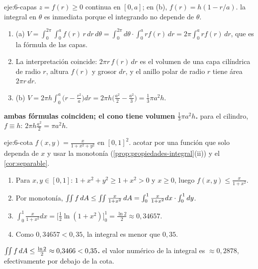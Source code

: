 \begin{solucion}{eje:6-capas}
\datos $z=f(r)\ge0$ continua en $[0,a]$; en (b), $f(r)=h(1-r/a)$.
\planteamiento la integral en $\theta$ es inmediata porque el integrando no depende de $\theta$.
\pasos
\begin{enumerate}[label=\arabic*.]
  \item (a) $V=\int_0^{2\pi}\int_0^af(r)\,r\,dr\,d\theta=\int_0^{2\pi}d\theta\cdot\int_0^arf(r)\,dr=2\pi\int_0^arf(r)\,dr$, que es la fórmula de las capas.
  \item La interpretación coincide: $2\pi r\,f(r)\,dr$ es el volumen de una capa cilíndrica de radio $r$, altura $f(r)$ y grosor $dr$, y el anillo polar de radio $r$ tiene área $2\pi r\,dr$.
  \item (b) $V=2\pi h\int_0^a\bigl(r-\frac{r^2}{a}\bigr)dr=2\pi h\bigl(\frac{a^2}2-\frac{a^2}3\bigr)=\frac13\pi a^2h$.
\end{enumerate}
\resultado \textbf{ambas fórmulas coinciden; el cono tiene volumen $\frac13\pi a^2h$.}
\comprobacion para el cilindro, $f\equiv h$: $2\pi h\frac{a^2}{2}=\pi a^2h$.
\end{solucion}

\begin{solucion}{eje:6-cota}
\datos $f(x,y)=\frac{x}{1+x^2+y^2}$ en $[0,1]^2$.
\planteamiento acotar por una función que solo dependa de $x$ y usar la monotonía (\cref{prop:propiedades-integral}(ii)) y el \cref{cor:separable}.
\pasos
\begin{enumerate}[label=\arabic*.]
  \item Para $x,y\in[0,1]$: $1+x^2+y^2\ge1+x^2>0$ y $x\ge0$, luego $f(x,y)\le\frac{x}{1+x^2}$.
  \item Por monotonía, $\iint f\,dA\le\iint\frac{x}{1+x^2}\,dA=\int_0^1\frac{x}{1+x^2}dx\cdot\int_0^1dy$.
  \item $\int_0^1\frac{x}{1+x^2}dx=\bigl[\frac12\ln(1+x^2)\bigr]_0^1=\frac{\ln2}{2}\approx0{,}34657$.
  \item Como $0{,}34657<0{,}35$, la integral es menor que $0{,}35$.
\end{enumerate}
\resultado \textbf{$\iint f\,dA\le\frac{\ln2}2\approx0{,}3466<0{,}35$.}
\comprobacion el valor numérico de la integral es $\approx0{,}2878$, efectivamente por debajo de la cota.
\end{solucion}

